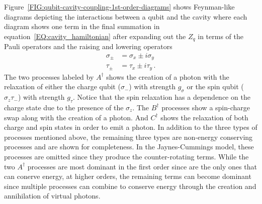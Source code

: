 Figure~\ref{FIG:qubit-cavity-coupling-1st-order-diagrams} shows Feynman-like diagrams depicting the interactions between a qubit and the cavity where each diagram shows one term in the final summation in equation~\ref{EQ:cavity_hamiltonian} after expanding out the $Z_q$ in terms of the Pauli operators and the raising and lowering operators
\begin{align}
    \sigma_\pm & = \sigma_x \pm i\sigma_y     \\
    \tau_\pm   & = \tau_x \pm i\tau_y     \,.
\end{align}
The two processes labeled by $A^\dagger$ shows the creation of a photon with the relaxation of either the charge qubit ($\sigma_-$) with strength $g_\sigma$ or the spin qubit ($\sigma_z\tau_-$) with strength $g_\tau$.
Notice that the spin relaxation has a dependence on the charge state due to the presence of the $\sigma_z$.
The $B^\dagger$ processes show a spin-charge swap along with the creation of a photon.
And $C^\dagger$ shows the relaxation of both charge and spin states in order to emit a photon.
In addition to the three types of processes mentioned above, the remaining three types are non-energy conserving processes and are shown for completeness.
In the Jaynes-Cummings model, these processes are omitted since they produce the counter-rotating terms.
While the two $A^\dagger$ processes are most dominant in the first order since are the only ones that can conerve energy, at higher orders, the remaining terms can become dominant since multiple processes can combine to conserve energy through the creation and annihilation of virtual photons.

